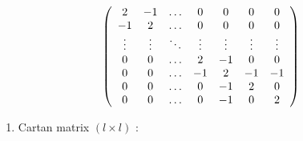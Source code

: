 \[
\left( \begin{array}{c c c c c c c} 2 & - 1 & \dots & 0 & 0 & 0 & 0 \\ - 1 & 2 & \dots & 0 & 0 & 0 & 0 \\ \vdots & \vdots & \ddots & \vdots & \vdots & \vdots & \vdots \\ 0 & 0 & \dots & 2 & - 1 & 0 & 0 \\ 0 & 0 & \dots & - 1 & 2 & - 1 & - 1 \\ 0 & 0 & \dots & 0 & - 1 & 2 & 0 \\ 0 & 0 & \dots & 0 & - 1 & 0 & 2 \end{array} \right)
\]

\begin{enumerate}
\def\labelenumi{(\Roman{enumi})}
\setcounter{enumi}{12}
\tightlist
\item
  Cartan matrix \((l\times l)\) :
\end{enumerate}

